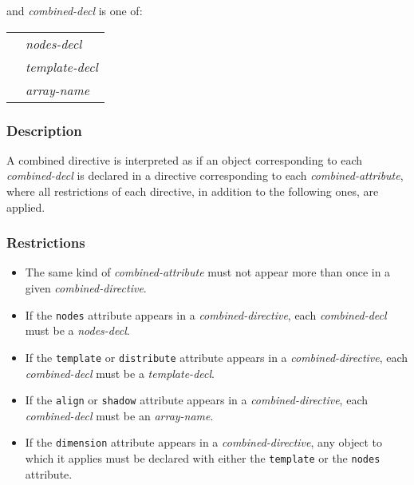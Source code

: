 \vspace{0.3cm}

and {\it combined-decl} is one of:

\vspace{0.3cm}

\begin{tabular}{ll}
 \hspace{0.5cm} & {\it nodes-decl} \\
 & {\it template-decl} \\
 & {\it array-name}
\end{tabular}

\subsubsection*{Description}

A combined directive is interpreted as if an object corresponding to
each {\it combined-decl} is declared in a directive corresponding to
each {\it combined-attribute}, where all restrictions of each directive,
in addition to the following ones, are applied.

\subsubsection*{Restrictions}

\begin{itemize}
 \item The same kind of {\it combined-attribute} must not appear more
       than once in a given {\it combined-directive}.
 \item If the {\tt nodes} attribute appears in a {\it
       combined-directive}, each {\it combined-decl} must be a {\it
       nodes-decl}.
 \item If the {\tt template} or {\tt distribute} attribute appears in a
       {\it combined-directive}, each {\it combined-decl} must be a {\it
       template-decl}.
 \item If the {\tt align} or {\tt shadow} attribute appears in a
       {\it combined-directive}, each {\it combined-decl} must be an
       {\it array-name}.
 \item If the {\tt dimension} attribute appears in a {\it
       combined-directive}, any object to which it applies must be
       declared with either the {\tt template} or the {\tt nodes}
       attribute.
\end{itemize}
